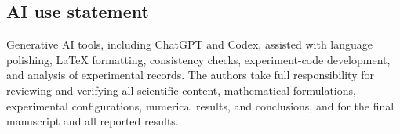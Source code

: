 \documentclass{article}
\begin{document}
\subsection*{AI use statement}
Generative AI tools, including ChatGPT and Codex, assisted with language polishing, LaTeX formatting, consistency checks, experiment-code development, and analysis of experimental records. The authors take full responsibility for reviewing and verifying all scientific
content, mathematical formulations, experimental configurations, numerical
results, and conclusions, and for the final manuscript and all reported results.




\appendix





\FloatBarrier


\FloatBarrier

\FloatBarrier

\end{document}
